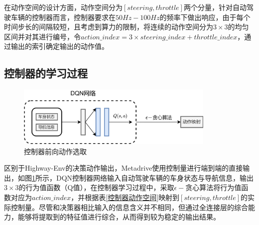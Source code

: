\begin{table}[htbp]
    \caption{控制器动作空间}\label{控制器动作空间}
    \centering
    \renewcommand\arraystretch{1.5}
\end{table}

在动作空间的设计方面，动作空间分为$[steering, throttle]$两个分量，针对自动驾驶车辆的控制器而言，控制器要求在$50Hz-100Hz$的频率下做出响应，由于每个时间步长的间隔较短，且考虑到算力的限制，将连续的动作空间分为$3 \times 3$的均匀区间并对其进行编号，令$action\_index = 3 \times steering\_index + throttle\_index$，通过输出的索引确定输出的动作值。

\subsection{控制器的学习过程}

\begin{figure}[htbp]
    \centering
    \includegraphics[width=0.85\textwidth]{images/chapter3/metadrive_forward.png}
    \caption{控制器前向动作选取}\label{控制器前向} %
\end{figure}  

区别于Highway-Env的决策动作输出，Metadrive使用控制量进行端到端的直接输出，如图\ref{控制器前向}所示，DQN控制器网络输入自动驾驶车辆的车身状态与导航信息，输出$3 \times 3$的行为值函数（Q值），在控制器学习过程中，采取$\epsilon-$贪心算法将行为值函数对应为$action\_index$，并根据表\ref{控制器动作空间}映射到$[steering, throttle]$的实际控制量。尽管和决策器相比输入的信息含义并不相同，但通过全连接层的综合能力，能够将提取到的特征值进行综合，从而得到较为稳定的输出结果。

